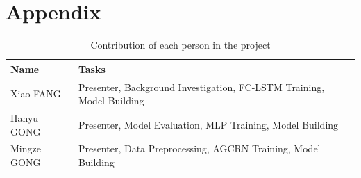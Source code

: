 \documentclass[sigconf, authordraft]{acmart}
\begin{document}




\appendix
\section{Appendix}
\renewcommand{\thetable}{A.\arabic{table}}
\setcounter{table}{0}


\begin{table}[ht]
	\centering
	\caption{Contribution of each person in the project}
	\begin{tabularx}
		{\columnwidth}{|>{\centering\arraybackslash}m{2cm}|X|}
		\hline
		\textbf{Name} & \textbf{Tasks}                                                        \\
		\hline
		Xiao FANG     & Presenter, Background Investigation, FC-LSTM Training, Model Building \\
		\hline
		Hanyu GONG    & Presenter, Model Evaluation, MLP Training, Model Building             \\
		\hline
		Mingze GONG   & Presenter, Data Preprocessing, AGCRN Training, Model Building         \\
		\hline
	\end{tabularx}
	\label{table:contributions}
\end{table}
\end{document}
